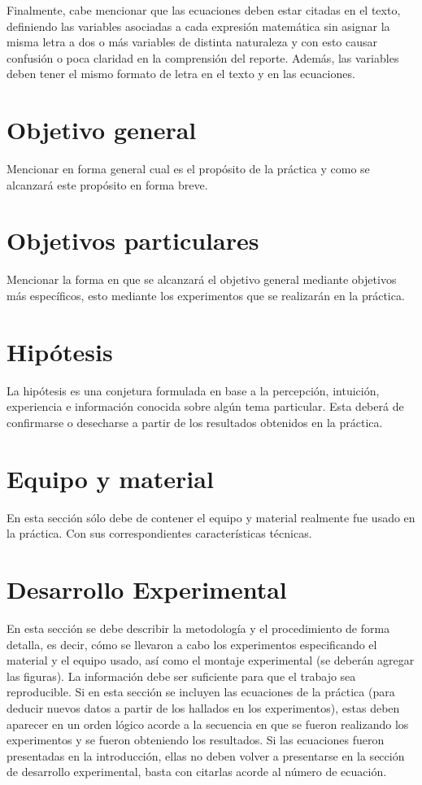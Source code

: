 \documentclass{replab}
\begin{document}
Finalmente, cabe mencionar que las ecuaciones deben estar citadas en el texto, definiendo las variables asociadas a cada expresión matemática sin asignar la misma letra a dos o más variables de distinta naturaleza y con esto causar confusión o poca claridad en la comprensión del reporte. Además, las variables deben tener el mismo formato de letra en el texto y en las ecuaciones.

\section{Objetivo general}

Mencionar en forma general cual es el propósito de la práctica y como se alcanzará este propósito en forma breve.

\section{Objetivos particulares}

Mencionar la forma en que se alcanzará el objetivo general mediante objetivos más específicos, esto mediante los experimentos que se realizarán en la práctica.

\section{Hipótesis}

La hipótesis es una conjetura formulada en base a la percepción, intuición, experiencia e información conocida sobre algún tema particular. Esta deberá de confirmarse o desecharse a partir de los resultados obtenidos en la práctica.

\section{Equipo y material}

En esta sección sólo debe de contener el equipo y material realmente fue usado en la práctica. Con sus correspondientes características técnicas.

\section{Desarrollo Experimental}

En esta sección se debe describir la metodología y el procedimiento de forma detalla, es decir, cómo se llevaron a cabo los experimentos especificando el material y el equipo usado, así como el montaje experimental (se deberán agregar las figuras). La información debe ser suficiente para que el trabajo sea reproducible. Si en esta sección se incluyen las ecuaciones de la práctica (para deducir nuevos datos a partir de los hallados en los experimentos), estas deben aparecer en un orden lógico acorde a la secuencia en que se fueron realizando los experimentos y se fueron obteniendo los resultados. Si las ecuaciones fueron presentadas en la introducción, ellas no deben volver a presentarse en la sección de desarrollo experimental, basta con citarlas acorde al número de ecuación.
\end{document}
